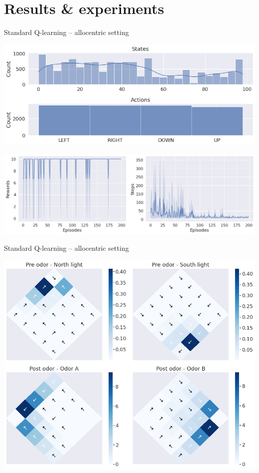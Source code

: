 \documentclass[bigger]{beamer}
\begin{document}
\section{Results \& experiments}
\label{sec:org0ce1b2a}
\begin{frame}[label={sec:org296e313}]{Standard Q-learning -- allocentric setting}
\begin{center}
\includegraphics[height=0.4\textheight]{img/q-learning_allo_hist.png}
\end{center}
\begin{center}
\includegraphics[height=0.4\textheight]{img/q-learning_allo_steps_rewards.png}
\end{center}
\end{frame}
\begin{frame}[label={sec:orgaf73fe4}]{Standard Q-learning -- allocentric setting}
\begin{center}
\includegraphics[width=.9\linewidth]{img/q-learning_allo_best_actions_maps.png}
\end{center}
\end{frame}
\end{document}
